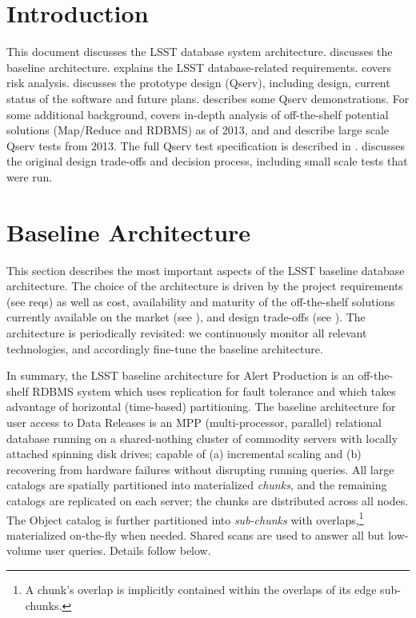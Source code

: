 \documentclass[DM,lsstdraft,toc]{lsstdoc}
\begin{document}
\section{Introduction}\label{introduction}

This document discusses the LSST database system architecture.  discusses the baseline
architecture.  explains the LSST database-related
requirements.
 covers risk analysis.
 discusses the
prototype design (Qserv), including design, current status of the
software and future plans.
 describes some Qserv demonstrations.
For some additional background,  covers in-depth analysis
of off-the-shelf potential solutions (Map/Reduce and RDBMS) as of 2013,
and  and  describe large scale Qserv tests from 2013.
The full Qserv test specification is described in .
 discusses the original design trade-offs
and decision process, including small scale tests that were run.

\section{Baseline Architecture}\label{baseline-architecture}

This section describes the most important aspects of the LSST baseline
database architecture. The choice of the architecture is driven by the
project requirements (see reqs) as well as cost, availability and
maturity of the off-the-shelf solutions currently available on the
market (see ), and design trade-offs (see
). The architecture is periodically revisited: we
continuously monitor all relevant technologies, and accordingly
fine-tune the baseline architecture.

In summary, the LSST baseline architecture for Alert Production is an
off-the-shelf RDBMS system which uses replication for fault tolerance
and which takes advantage of horizontal (time-based) partitioning. The
baseline architecture for user access to Data Releases is an MPP
(multi-processor, parallel) relational database running on a
shared-nothing cluster of commodity servers with locally attached
spinning disk drives; capable of (a) incremental scaling and (b)
recovering from hardware failures without disrupting running queries.
All large catalogs are spatially partitioned into materialized
\emph{chunks}, and the remaining catalogs are replicated on each server;
the chunks are distributed across all nodes. The Object catalog is
further partitioned into \emph{sub-chunks} with overlaps,\footnote{A
  chunk's overlap is implicitly contained within the overlaps of its
  edge sub-chunks.} materialized on-the-fly when needed. Shared scans
are used to answer all but low-volume user queries. Details follow
below.
\end{document}
